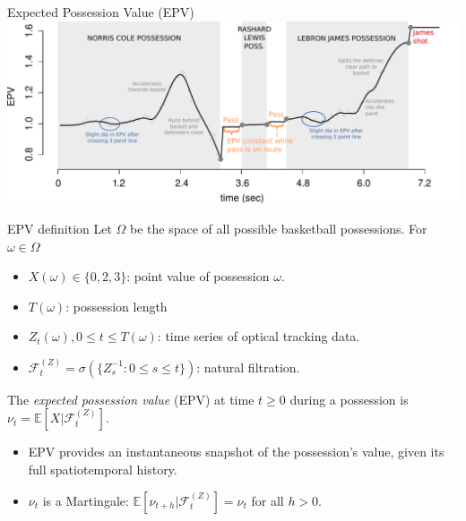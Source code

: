 \documentclass[10pt]{beamer}
\newcommand{\E}{\mathbb{E}}											%
\newcommand{\Fz}{\mathcal{F}^{(Z)}}
\begin{document}
\begin{frame}{Expected Possession Value (EPV)}
\includegraphics[width=1.0\textwidth]{graphics/ticker_1_edit}
\end{frame}

\begin{frame}{EPV definition}
Let $\Omega$ be the space of all possible basketball possessions. For $\omega \in \Omega$
\begin{itemize}
\pause 
\item $X(\omega) \in \{0, 2, 3\}$: point value of possession $\omega$.
\pause
\item $T(\omega)$: possession length
\pause
\item $Z_t(\omega), 0 \leq t \leq T(\omega)$: time series of optical tracking data.
\pause
\item $\Fz_t = \sigma(\{Z_s^{-1}: 0 \leq s \leq t\})$: natural filtration.
\end{itemize}
\pause
\begin{definition}
The \textit{expected possession value} (EPV) at time $t \geq 0$ during a possession is $\nu_t = \E[X|\Fz_t]$.
\end{definition}
\pause
\begin{itemize}
\item EPV provides an instantaneous snapshot of the possession's value, given its full spatiotemporal history.
\item $\nu_t$ is a Martingale: $\E[\nu_{t + h} | \Fz_t] = \nu_t$ for all $h > 0$.
\end{itemize}
\end{frame}
\end{document}
